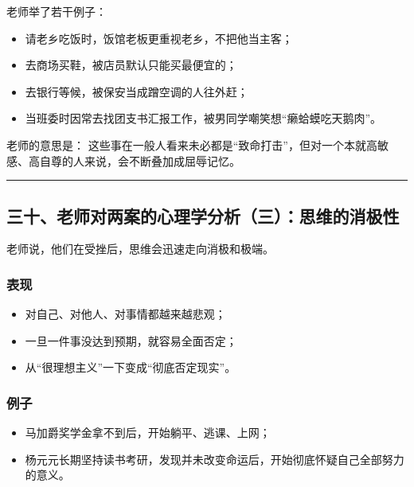 \documentclass[
  chinese,
  9pt,
  a4paper,
]{ctexart}
\providecommand{\tightlist}{%
  \setlength{\itemsep}{0pt}\setlength{\parskip}{0pt}}
\begin{document}
老师举了若干例子：

\begin{itemize}
\tightlist
\item
  请老乡吃饭时，饭馆老板更重视老乡，不把他当主客；
\item
  去商场买鞋，被店员默认只能买最便宜的；
\item
  去银行等候，被保安当成蹭空调的人往外赶；
\item
  当班委时因常去找团支书汇报工作，被男同学嘲笑想``癞蛤蟆吃天鹅肉''。
\end{itemize}

老师的意思是：
这些事在一般人看来未必都是``致命打击''，但对一个本就高敏感、高自尊的人来说，会不断叠加成屈辱记忆。

\begin{center}\rule{0.5\linewidth}{0.5pt}\end{center}

\subsection{三十、老师对两案的心理学分析（三）：思维的消极性}\label{ux4e09ux5341ux8001ux5e08ux5bf9ux4e24ux6848ux7684ux5fc3ux7406ux5b66ux5206ux6790ux4e09ux601dux7ef4ux7684ux6d88ux6781ux6027}

老师说，他们在受挫后，思维会迅速走向消极和极端。

\subsubsection{表现}\label{ux8868ux73b0}

\begin{itemize}
\tightlist
\item
  对自己、对他人、对事情都越来越悲观；
\item
  一旦一件事没达到预期，就容易全面否定；
\item
  从``很理想主义''一下变成``彻底否定现实''。
\end{itemize}

\subsubsection{例子}\label{ux4f8bux5b50}

\begin{itemize}
\tightlist
\item
  马加爵奖学金拿不到后，开始躺平、逃课、上网；
\item
  杨元元长期坚持读书考研，发现并未改变命运后，开始彻底怀疑自己全部努力的意义。
\end{itemize}
\end{document}
